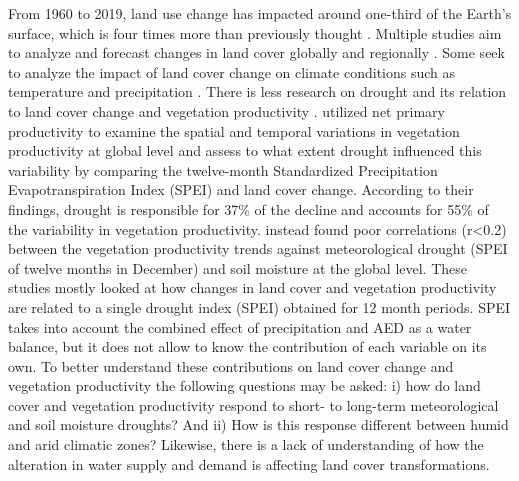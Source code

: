 \documentclass[
  authoryear,
  preprint,
  3p,
  onecolumn]{elsarticle}
\begin{document}
From 1960 to 2019, land use change has impacted around one-third of the
Earth's surface, which is four times more than previously thought
\citep{Winkler2021}. Multiple studies aim to analyze and forecast
changes in land cover globally \citep{Winkler2021, Song2018} and
regionally
\citep{Chamling2020, Homer2020, Yang2021, Schulz2010, Echeverria2012}.
Some seek to analyze the impact of land cover change on climate
conditions such as temperature and precipitation
\citep{Luyssaert2014, Pitman2012}. There is less research on drought and
its relation to land cover change and vegetation productivity
\citep{Chen2022, Akinyemi2021, Peng2017}. \citet{Peng2017} utilized net
primary productivity to examine the spatial and temporal variations in
vegetation productivity at global level and assess to what extent
drought influenced this variability by comparing the twelve-month
Standardized Precipitation Evapotranspiration Index (SPEI) and land
cover change. According to their findings, drought is responsible for
37\% of the decline and accounts for 55\% of the variability in
vegetation productivity. \citet{Chen2022} instead found poor
correlations (r\textless0.2) between the vegetation productivity trends
against meteorological drought (SPEI of twelve months in December) and
soil moisture at the global level. These studies mostly looked at how
changes in land cover and vegetation productivity are related to a
single drought index (SPEI) obtained for 12 month periods. SPEI takes
into account the combined effect of precipitation and AED as a water
balance, but it does not allow to know the contribution of each variable
on its own. To better understand these contributions on land cover
change and vegetation productivity the following questions may be asked:
i) how do land cover and vegetation productivity respond to short- to
long-term meteorological and soil moisture droughts? And ii) How is this
response different between humid and arid climatic zones? Likewise,
there is a lack of understanding of how the alteration in water supply
and demand is affecting land cover transformations.
\end{document}
